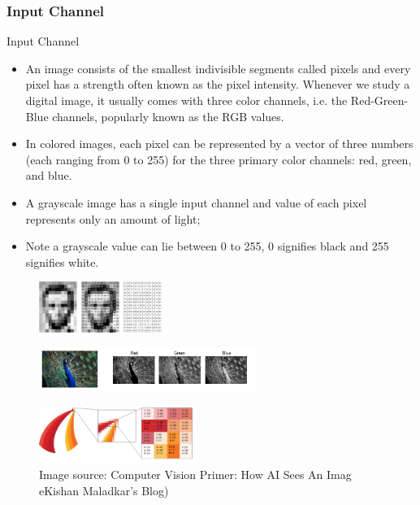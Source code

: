 







\frametitle{Input Channel}

\begin{vbframe}{Input Channel}
    \begin{itemize}
       \item An image consists of the smallest indivisible segments called pixels and every pixel has a strength often known as the pixel intensity. Whenever we study a digital image, it usually comes with three color channels, i.e. the Red-Green-Blue channels, popularly known as the RGB values. 
       \item In colored images, each pixel can be represented by a vector of three numbers (each ranging from 0 to 255) for the three primary color channels: red, green, and blue.
       \item A grayscale image has a single input channel and value of each pixel represents only an amount of light; 
       \item Note a grayscale value can lie between 0 to 255, 0 signifies black and 255 signifies white. 
    \end{itemize}


 \begin{figure}
    \centering
    \includegraphics[width=4cm]{figure/gray.png}
  \end{figure}

 \begin{figure}
    \centering
    \includegraphics[width=7cm]{figure/RGB.jpeg}
  \end{figure}

 \begin{figure}
    \centering
    \includegraphics[width=5cm]{figure/RGB-1.png}
    \caption{\tiny Image source: Computer Vision Primer: How AI Sees An Imag eKishan Maladkar's Blog)}
  \end{figure}


\end{vbframe}
